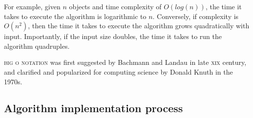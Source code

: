 \documentclass[a4paper]{article}
\begin{document}
\begin{description}
        For example, given $n$ objects and time complexity of $O(log(n))$, the
        time it takes to execute the algorithm is logarithmic to $n$.
        Conversely, if complexity is $O(n^2)$, then the time it takes to
        execute the algorithm grows quadratically with input. Importantly, if
        the input size doubles, the time it takes to run the algorithm
        quadruples.

        \textsc{big o notation} was first suggested by
        Bachmann\cite{bachmann1894analytische} and Landau\cite{landau1911} in
        late \textsc{xix} century, and clarified and popularized for computing
        science by Donald Knuth\cite{knuth1976big} in the 1970s.

\end{description}

\subsection{Algorithm implementation process}

\end{document}

